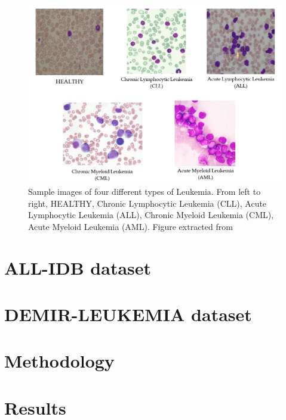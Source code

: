 \documentclass[11pt, openany]{report}
\theoremstyle{plain}
\theoremstyle{definition}
\theoremstyle{remark}
\begin{document}
\begin{figure}[H]
  \centering
  \includegraphics[scale=0.6]{figures/leukemia-subtypes.png}
  \caption{Sample images of four different types of Leukemia. From left to right, HEALTHY, Chronic Lymphocytic Leukemia (CLL), Acute Lymphocytic Leukemia (ALL), Chronic Myeloid Leukemia (CML), Acute Myeloid Leukemia (AML). Figure extracted from \cite{leukemia}}
  \label{fig:leukemia-subtypes}
\end{figure}


\section{ALL-IDB dataset}

\section{DEMIR-LEUKEMIA dataset}

\section{Methodology}

\section{Results}



\nocite{*}

\end{document}
